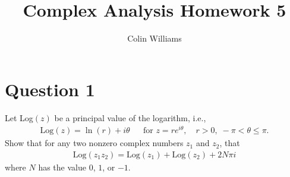 \documentclass[10pt,a4paper]{article}
\title{Complex Analysis Homework 5}
\author{Colin Williams}
\theoremstyle{definition}
\begin{document}
\maketitle

\section*{Question 1}
Let Log$(z)$ be a principal value of the logarithm, i.e.,
\begin{align*}
\text{Log}(z) = \ln(r) + i\theta && \text{for } z = re^{i\theta}, \quad r > 0, \; -\pi < \theta \leq \pi.
\end{align*}
Show that for any two nonzero complex numbers $z_1$ and $z_2$, that 
\begin{align}
\text{Log}(z_1z_2) = \text{Log}(z_1) + \text{Log}(z_2) + 2N\pi i
\end{align}
where $N$ has the value $0$, $1$, or $-1$.
\end{document}
